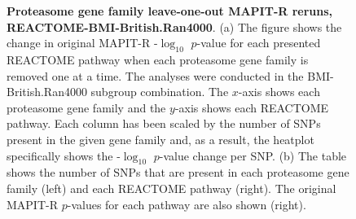 \begin{figure}[ht]
\centering
\vspace*{-.5cm}
\par
{}
\caption[TBD]{\textbf{Proteasome gene family leave-one-out MAPIT-R reruns, REACTOME-BMI-British.Ran4000}. (a) The figure shows the change in original MAPIT-R -$\log_{10}$ $p$-value for each presented REACTOME pathway when each proteasome gene family is removed one at a time. The analyses were conducted in the BMI-British.Ran4000 subgroup combination. The $x$-axis shows each proteasome gene family and the $y$-axis shows each REACTOME pathway. Each column has been scaled by the number of SNPs present in the given gene family and, as a result, the heatplot specifically shows the -$\log_{10}$ $p$-value change per SNP. (b) The table shows the number of SNPs that are present in each proteasome gene family (left) and each REACTOME pathway (right). The original MAPIT-R $p$-values for each pathway are also shown (right).}

\end{figure}
